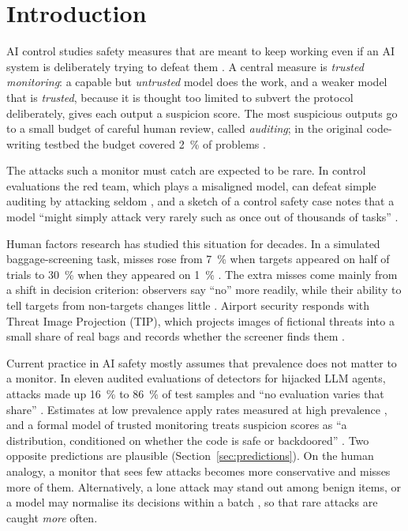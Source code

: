 \documentclass[manuscript, screen, review]{jair}
\begin{document}
\section{Introduction}\label{sec:intro}

AI control studies safety measures that are meant to keep working even if an AI system is deliberately trying to defeat them \parencite{greenblatt2024}. A central measure is \emph{trusted monitoring}: a capable but \emph{untrusted} model does the work, and a weaker model that is \emph{trusted}, because it is thought too limited to subvert the protocol deliberately, gives each output a suspicion score. The most suspicious outputs go to a small budget of careful human review, called \emph{auditing}; in the original code-writing testbed the budget covered \SI{2}{\percent} of problems \parencite[Sec.~2.2]{greenblatt2024}.

The attacks such a monitor must catch are expected to be rare. In control evaluations the red team, which plays a misaligned model, can defeat simple auditing by attacking seldom \parencites[Sec.~3.1]{greenblatt2024}[Sec.~3.1]{bhatt2025}, and a sketch of a control safety case notes that a model ``might simply attack very rarely such as once out of thousands of tasks'' \parencite[Sec.~6]{korbak2025}.

Human factors research has studied this situation for decades. In a simulated baggage-screening task, misses rose from \SI{7}{\percent} when targets appeared on half of trials to \SI{30}{\percent} when they appeared on \SI{1}{\percent} \parencite{wolfe2005}. The extra misses come mainly from a shift in decision criterion: observers say ``no'' more readily, while their ability to tell targets from non-targets changes little \parencite{wolfe2007}. Airport security responds with Threat Image Projection (TIP), which projects images of fictional threats into a small share of real bags and records whether the screener finds them \parencite{cutler2009,buser2025}.

Current practice in AI safety mostly assumes that prevalence does not matter to a monitor. In eleven audited evaluations of detectors for hijacked LLM agents, attacks made up \SI{16}{\percent} to \SI{86}{\percent} of test samples and ``no evaluation varies that share'' \parencite[Abstract]{abbasi2026}. Estimates at low prevalence apply rates measured at high prevalence \parencites[Sec.~6.3]{srivastav2026}[Sec.~III.E]{abbasi2026}, and a formal model of trusted monitoring treats suspicion scores as ``a distribution, conditioned on whether the code is safe or backdoored'' \parencite[Sec.~2]{griffin2024}. Two opposite predictions are plausible (Section~\ref{sec:predictions}). On the human analogy, a monitor that sees few attacks becomes more conservative and misses more of them. Alternatively, a lone attack may stand out among benign items, or a model may normalise its decisions within a batch \parencite{hida2026}, so that rare attacks are caught \emph{more} often.
\end{document}
